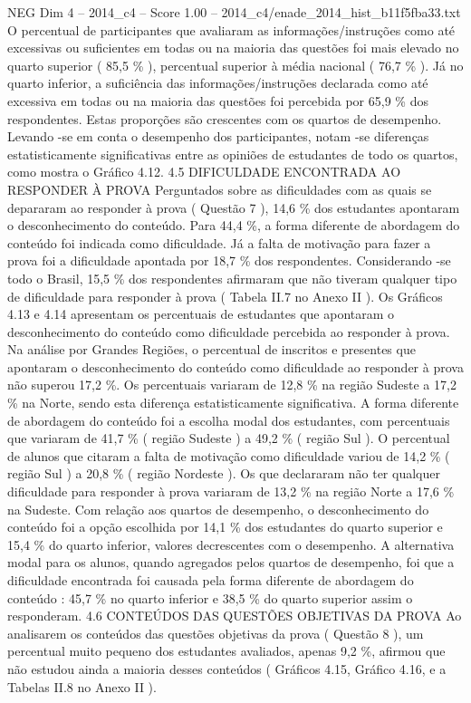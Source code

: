\begin{textsample}{NEG Dim 4 – 2014\_c4 – Score 1.00 – 2014\_c4/enade\_2014\_hist\_b11f5fba33.txt}
O percentual de participantes que avaliaram as informações/instruções como até excessivas ou suficientes em todas ou na maioria das questões foi mais elevado no quarto superior ( 85,5 \% ), percentual superior à média nacional ( 76,7 \% ).
Já no quarto inferior, a suficiência das informações/instruções declarada como até excessiva em todas ou na maioria das questões foi percebida por 65,9 \% dos respondentes.
Estas proporções são crescentes com os quartos de desempenho.
Levando -se em conta o desempenho dos participantes, notam -se diferenças estatisticamente significativas entre as opiniões de estudantes de todo os quartos, como mostra o Gráfico 4.12. 4.5 DIFICULDADE ENCONTRADA AO RESPONDER À PROVA Perguntados sobre as dificuldades com as quais se depararam ao responder à prova ( Questão 7 ), 14,6 \% dos estudantes apontaram o desconhecimento do conteúdo.
Para 44,4 \%, a forma diferente de abordagem do conteúdo foi indicada como dificuldade.
Já a falta de motivação para fazer a prova foi a dificuldade apontada por 18,7 \% dos respondentes.
Considerando -se todo o Brasil, 15,5 \% dos respondentes afirmaram que não tiveram qualquer tipo de dificuldade para responder à prova ( Tabela II.7 no Anexo II ).
Os Gráficos 4.13 e 4.14 apresentam os percentuais de estudantes que apontaram o desconhecimento do conteúdo como dificuldade percebida ao responder à prova.
Na análise por Grandes Regiões, o percentual de inscritos e presentes que apontaram o desconhecimento do conteúdo como dificuldade ao responder à prova não superou 17,2 \%.
Os percentuais variaram de 12,8 \% na região Sudeste a 17,2 \% na Norte, sendo esta diferença estatisticamente significativa.
A forma diferente de abordagem do conteúdo foi a escolha modal dos estudantes, com percentuais que variaram de 41,7 \% ( região Sudeste ) a 49,2 \% ( região Sul ).
O percentual de alunos que citaram a falta de motivação como dificuldade variou de 14,2 \% ( região Sul ) a 20,8 \% ( região Nordeste ).
Os que declararam não ter qualquer dificuldade para responder à prova variaram de 13,2 \% na região Norte a 17,6 \% na Sudeste.
Com relação aos quartos de desempenho, o desconhecimento do conteúdo foi a opção escolhida por 14,1 \% dos estudantes do quarto superior e 15,4 \% do quarto inferior, valores decrescentes com o desempenho.
A alternativa modal para os alunos, quando agregados pelos quartos de desempenho, foi que a dificuldade encontrada foi causada pela forma diferente de abordagem do conteúdo : 45,7 \% no quarto inferior e 38,5 \% do quarto superior assim o responderam. 4.6 CONTEÚDOS DAS QUESTÕES OBJETIVAS DA PROVA Ao analisarem os conteúdos das questões objetivas da prova ( Questão 8 ), um percentual muito pequeno dos estudantes avaliados, apenas 9,2 \%, afirmou que não estudou ainda a maioria desses conteúdos ( Gráficos 4.15, Gráfico 4.16, e a Tabelas II.8 no Anexo II ).

\end{textsample}
